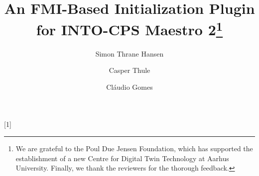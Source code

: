 \documentclass[runningheads]{llncs}
\begin{document}
[1]{%
  \def\tikz@width{#1}%
  \def\tikzscale{1}\begin{lrbox}{\measure@tikzpicture}%
  \BODY
  \end{lrbox}%
  \edef\tikzscale{\pgfmathresult}%
  \BODY
}
%
\title{An FMI-Based Initialization Plugin for INTO-CPS Maestro 2\thanks{We are grateful to the Poul Due Jensen Foundation, which has supported the establishment of a new Centre for Digital Twin Technology at Aarhus University. Finally, we thank the reviewers for the thorough feedback.}}

%
%
\author{Simon Thrane Hansen \and
Casper Thule \and
Cláudio Gomes }
%
%
%

\maketitle              %
%
















%



\end{document}
